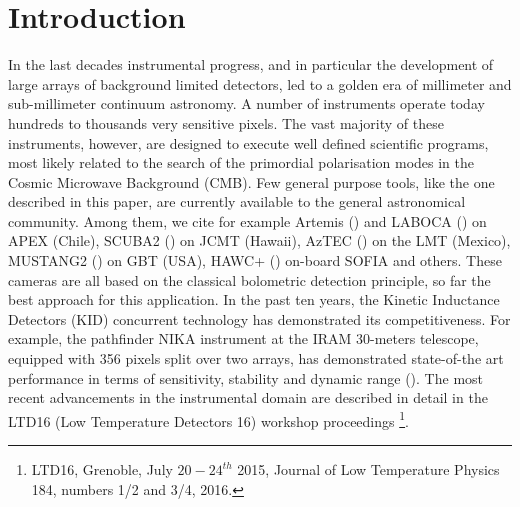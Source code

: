 \documentclass[]{aa} %
\begin{document}

   \maketitle
%

\section{Introduction}

In the last decades instrumental progress, and in particular the development of large arrays of background limited detectors, led to a golden era of millimeter and sub-millimeter continuum astronomy. A number of instruments operate today hundreds to thousands very sensitive pixels. The vast majority of these instruments, however, are designed to execute well defined scientific programs, most likely related to the search of the primordial polarisation modes in the Cosmic Microwave Background (CMB). Few general purpose tools, like the one described in this paper, are currently available to the general astronomical community. Among them, we cite for example Artemis (\cite{Reveret2014}) and LABOCA (\cite{Siringo2009}) on APEX (Chile), SCUBA2 (\cite{Holland2013}) on JCMT (Hawaii), AzTEC (\cite{Chavez-Dagostino2016}) on the LMT (Mexico), MUSTANG2 (\cite{Dicker2014}) on GBT (USA), HAWC+ (\cite{Staguhn2016}) on-board SOFIA and others. These cameras are all based on the classical bolometric detection principle, so far the best approach for this application. In the past ten years, the Kinetic Inductance Detectors (KID) concurrent technology has demonstrated its competitiveness. For example, the pathfinder NIKA instrument at the IRAM 30-meters telescope, equipped with 356 pixels split over two arrays, has demonstrated state-of-the art performance in terms of sensitivity, stability and dynamic range (\cite{Monfardini2010, Monfardini2011, Catalano2014, Adam2014}). The most recent advancements in the instrumental domain are described in detail in the LTD16 (Low Temperature Detectors 16) workshop proceedings \footnote{LTD16, Grenoble, July $20-24^{th}$ 2015,  Journal of Low Temperature Physics 184, numbers 1/2 and 3/4, 2016.}. 

\end{document}
